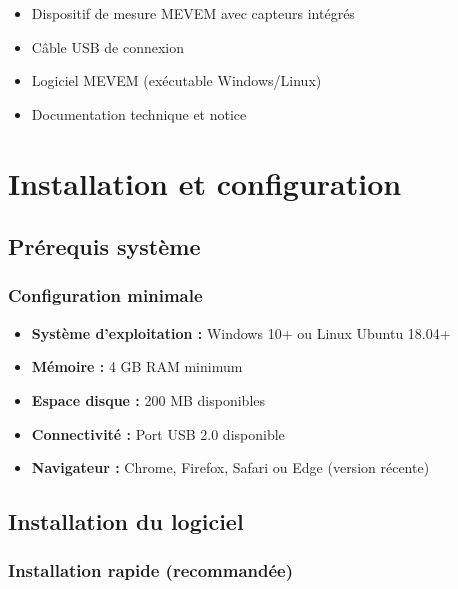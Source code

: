 \documentclass[12pt,a4paper]{article}
\begin{document}
\begin{itemize}
    \item Dispositif de mesure MEVEM avec capteurs intégrés
    \item Câble USB de connexion
    \item Logiciel MEVEM (exécutable Windows/Linux)
    \item Documentation technique et notice
\end{itemize}

\section{Installation et configuration}

\subsection{Prérequis système}

\subsubsection{Configuration minimale}
\begin{itemize}
    \item \textbf{Système d'exploitation :} Windows 10+ ou Linux Ubuntu 18.04+
    \item \textbf{Mémoire :} 4 GB RAM minimum
    \item \textbf{Espace disque :} 200 MB disponibles
    \item \textbf{Connectivité :} Port USB 2.0 disponible
    \item \textbf{Navigateur :} Chrome, Firefox, Safari ou Edge (version récente)
\end{itemize}

\subsection{Installation du logiciel}

\subsubsection{Installation rapide (recommandée)}
\end{document}
